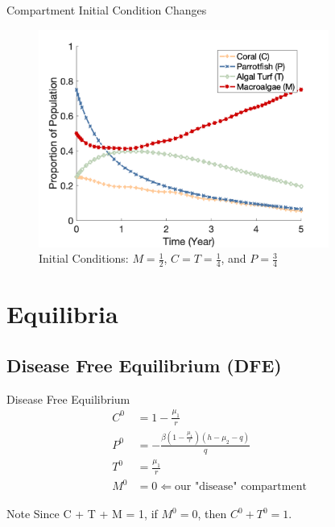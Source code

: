 \documentclass{beamer}
\begin{document}
\begin{frame}{Compartment Initial Condition Changes}
    \begin{figure}
        \centering
        \includegraphics[width=0.85\textwidth]{Latex/Figures/Graphs/0.25C_0.25T_0.5M.png}
        \caption{Initial Conditions: $M = \frac{1}{2}$, $C = T = \frac{1}{4}$, and $P = \frac{3}{4}$}
        \label{fig:macroalgae_dominant}
    \end{figure}
\end{frame}

\section{Equilibria}
\subsection{Disease Free Equilibrium (DFE)}
\begin{frame}{Disease Free Equilibrium}
    \begin{align*}
        C^{0} &= 1 - \frac{\mu_{1}}{r}\\
        P^{0} &= -\frac{\beta(1 - \frac{\mu_{1}}{r})(h - \mu_{2} - q)}{q}\\
        T^{0} &= \frac{\mu_{1}}{r}\\
        M^{0} &= 0 \Longleftarrow \text{our "disease" compartment}
    \end{align*}
    \begin{block}{Note}
    Since C + T + M = 1, if $M^{0} = 0$, then $C^{0} + T^{0} = 1$.
    \end{block}
\end{frame}
\end{document}
